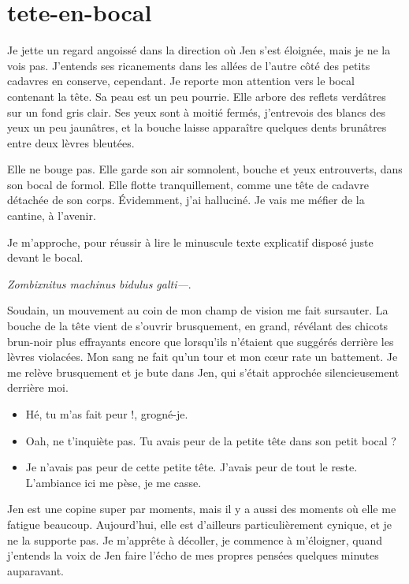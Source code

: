\section{tete-en-bocal}

Je jette un regard angoissé dans la direction où Jen s'est éloignée, mais je ne la vois pas. J'entends ses ricanements dans les allées de l'autre côté des petits cadavres en conserve, cependant. Je reporte mon attention vers le bocal contenant la tête. Sa peau est un peu pourrie. Elle arbore des reflets verdâtres sur un fond gris clair. Ses yeux sont à moitié fermés, j'entrevois des blancs des yeux un peu jaunâtres, et la bouche laisse apparaître quelques dents brunâtres entre deux lèvres bleutées.

Elle ne bouge pas. Elle garde son air somnolent, bouche et yeux entrouverts, dans son bocal de formol. Elle flotte tranquillement, comme une tête de cadavre détachée de son corps. Évidemment, j'ai halluciné. Je vais me méfier de la cantine, à l'avenir.

Je m'approche, pour réussir à lire le minuscule texte explicatif disposé juste devant le bocal.

\textit{Zombixnitus machinus bidulus galti—}.

Soudain, un mouvement au coin de mon champ de vision me fait sursauter. La bouche de la tête vient de s'ouvrir brusquement, en grand, révélant des chicots brun-noir plus effrayants encore que lorsqu'ils n'étaient que suggérés derrière les lèvres violacées. Mon sang ne fait qu'un tour et mon cœur rate un battement. Je me relève brusquement et je bute dans Jen, qui s'était approchée silencieusement derrière moi.

\begin{itemize}
\item Hé, tu m'as fait peur !, grogné-je.
\item Oah, ne t'inquiète pas. Tu avais peur de la petite tête dans son petit bocal ?
\item Je n'avais pas peur de cette petite tête. J'avais peur de tout le reste. L'ambiance ici me pèse, je me casse.
\end{itemize}

Jen est une copine super par moments, mais il y a aussi des moments où elle me fatigue beaucoup. Aujourd'hui, elle est d'ailleurs particulièrement cynique, et je ne la supporte pas. Je m'apprête à décoller, je commence à m'éloigner, quand j'entends la voix de Jen faire l'écho de mes propres pensées quelques minutes auparavant.

